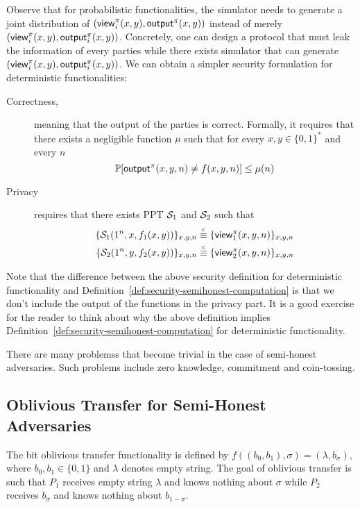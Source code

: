 Observe that for probabilistic functionalities, the simulator needs to generate a joint distribution of $({\sf view}_i^\pi(x,y), {\sf output}^\pi(x,y))$ instead of merely $({\sf view}_i^\pi(x,y),{\sf output}_i^\pi(x,y))$. Concretely, one can design a protocol that must leak the information of every parties while there exists simulator that can generate $({\sf view}_i^\pi(x,y),{\sf output}_i^\pi(x,y))$. We can obtain a simpler security formulation for deterministic functionalities:
\begin{description}
\item[Correctness,] meaning that the output of the parties is correct. Formally, it requires that there exists a negligible function $\mu$ such that for every $x,y\in\{0,1\}^*$ and every $n$
    $$\mathop{\mathbb P\/}[{\sf output}^\pi(x,y,n)\neq f(x,y,n)]\leq\mu(n)$$
\item[Privacy] requires that there exists PPT $\mathcal{S}_1$ and $\mathcal{S}_2$ such that
\begin{align*}
    \{\mathcal{S}_1(1^n,x,f_1(x,y))\}_{x,y,n} \stackrel{c}{\equiv} \{{\sf view}^\pi_1(x,y,n)\}_{x,y,n} \\
    \{\mathcal{S}_2(1^n,y,f_2(x,y))\}_{x,y,n} \stackrel{c}{\equiv} \{{\sf view}^\pi_2(x,y,n)\}_{x,y,n} \\
\end{align*}
\end{description}

\begin{remark}
Note that the difference between the above security definition for deterministic functionality and Definition~\ref{def:security-semihonest-computation} is that we don't include the output of the functions in the privacy part. It is a good exercise for the reader to think about why the above definition implies Definition~\ref{def:security-semihonest-computation} for deterministic functionality.
\end{remark}

\begin{remark} There are many problemss that become trivial in the case of semi-honest adversaries. Such problems include zero knowledge, commitment and coin-tossing.
\end{remark}
\subsection{Oblivious Transfer for Semi-Honest Adversaries}
The bit oblivious transfer functionality is defined by $f((b_0,b_1), \sigma )=(\lambda,b_\sigma)$, where $b_0,b_1\in\{0,1\}$ and $\lambda$ denotes empty string. The goal of oblivious transfer is such that $P_1$ receives empty string $\lambda$ and knows nothing about $\sigma$ while $P_2$ receives $b_{\sigma}$ and knows nothing about $b_{1-\sigma}$.
